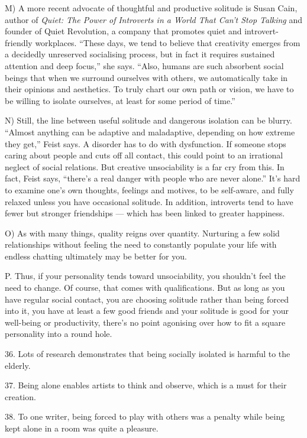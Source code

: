\documentclass[UTF8,11pt]{ctexart}
\begin{document}
M) A more recent advocate of thoughtful and productive solitude is Susan Cain, author of \textit{Quiet: The Power of} \textit{Introverts in a World That Can’t Stop Talking} and founder of Quiet Revolution, a company that promotes quiet and introvert-friendly workplaces. “These days, we tend to believe that creativity emerges from a decidedly unreserved socialising process, but in fact it requires sustained attention and deep focus,” she says. “Also, humans are such absorbent social beings that when we surround ourselves with others, we automatically take in their opinions and aesthetics. To truly chart our own path or vision, we have to be willing to isolate ourselves, at least for some period of time.”


N) Still, the line between useful solitude and dangerous isolation can be blurry. “Almost anything can be adaptive and maladaptive, depending on how extreme they get,” Feist says. A disorder has to do with dysfunction. If someone stops caring about people and cuts off all contact, this could point to an irrational neglect of social relations. But creative unsociability is a far cry from this. In fact, Feist says, “there’s a real danger with people who are never alone.” It’s hard to examine one’s own thoughts, feelings and motives, to be self-aware, and fully relaxed unless you have occasional solitude. In addition, introverts tend to have fewer but stronger friendships — which has been linked to greater happiness.


O) As with many things, quality reigns over quantity. Nurturing a few solid relationships without feeling the need to constantly populate your life with endless chatting ultimately may be better for you.


P. Thus, if your personality tends toward unsociability, you shouldn’t feel the need to change. Of course, that comes with qualifications. But as long as you have regular social contact, you are choosing solitude rather than being forced into it, you have at least a few good friends and your solitude is good for your well-being or productivity, there’s no point agonising over how to fit a square personality into a round hole.


36. Lots of research demonstrates that being socially isolated is harmful to the elderly.


37. Being alone enables artists to think and observe, which is a must for their creation.


38. To one writer, being forced to play with others was a penalty while being kept alone in a room was quite a pleasure.
\end{document}
